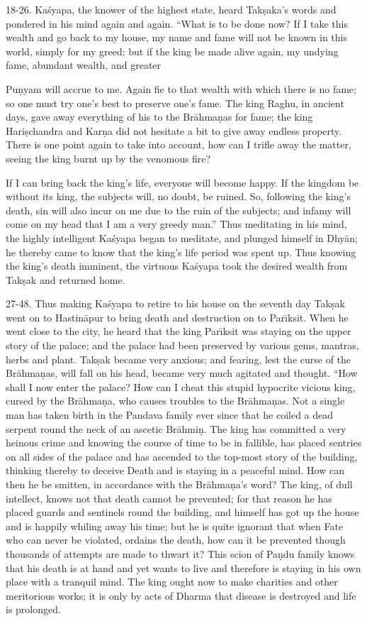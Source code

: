 18-26. Ka\'syapa, the knower of the highest state, heard Tak\d{s}aka's words and pondered in his mind again and again. ``What is to be done now? If I take this wealth and go back to my house, my name and fame will not be known in this world, simply for my greed; but if the king be made alive again, my undying fame, abundant wealth, and greater

Pu\d{n}yam will accrue to me. Again fie to that wealth with which there is no fame; so one must try one's best to preserve one's fame. The king Raghu, in ancient days, gave away everything of his to the Br\=ahma\d{n}as for fame; the king Hari\d{s}chandra and Kar\d{n}a did not hesitate a bit to give away endless property. There is one point again to take into account, how can I trifle away the matter, seeing the king burnt up by the venomous fire?

If I can bring back the king's life, everyone will become happy. If the kingdom be without its king, the subjects will, no doubt, be ruined. So, following the king's death, sin will also incur on me due to the ruin of the subjects; and infamy will come on my head that I am a very greedy man.'' Thus meditating in his mind, the highly intelligent Ka\'syapa began to meditate, and plunged himself in Dhy\=an; he thereby came to know that the king's life period was spent up. Thus knowing the king's death imminent, the virtuous Ka\'syapa took the desired wealth from Tak\d{s}ak and returned home.

27-48. Thus making Ka\'syapa to retire to his house on the seventh day Tak\d{s}ak went on to Hastin\=apur to bring death and destruction on to Par\={\i}ksit. When he went close to the city, he heard that the king Par\={\i}ksit was staying on the upper story of the palace; and the palace had been preserved by various gems, mantras, herbs and plant. Tak\d{s}ak became very anxious; and fearing, lest the curse of the Br\=ahma\d{n}as, will fall on his head, became very much agitated and thought. ``How shall I now enter the palace? How can I cheat this stupid hypocrite vicious king, cursed by the Br\=ahma\d{n}a, who causes troubles to the Br\=ahma\d{n}as. Not a single man has taken birth in the Pandava family ever since that he coiled a dead serpent round the neck of an ascetic Br\=ahmi\d{n}. The king has committed a very heinous crime and knowing the course of time to be in fallible, has placed sentries on all sides of the palace and has ascended to the top-most story of the building, thinking thereby to deceive Death and is staying in a peaceful mind. How can then he be smitten, in accordance with the Br\=ahma\d{n}a's word? The king, of dull intellect, knows not that death cannot be prevented; for that reason he has placed guards and sentinels round the building, and himself has got up the house and is happily whiling away his time; but he is quite ignorant that when Fate who can never be violated, ordains the death, how can it be prevented though thousands of attempts are made to thwart it? This scion of Pa\d{n}du family knows that his death is at hand and yet wants to live and therefore is staying in his own place with a tranquil mind. The king ought now to make charities and other meritorious works; it is only by acts of Dharma that disease is destroyed and life is prolonged.

